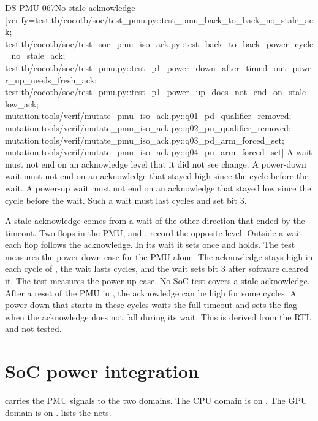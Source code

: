 \begin{requirement}{DS-PMU-067}{No stale acknowledge}
[verify={test:tb/cocotb/soc/test_pmu.py::test_pmu_back_to_back_no_stale_ack; test:tb/cocotb/soc/test_soc_pmu_iso_ack.py::test_back_to_back_power_cycle_no_stale_ack; test:tb/cocotb/soc/test_pmu.py::test_p1_power_down_after_timed_out_power_up_needs_fresh_ack; test:tb/cocotb/soc/test_pmu.py::test_p1_power_up_does_not_end_on_stale_low_ack; mutation:tools/verif/mutate_pmu_iso_ack.py::q01_pd_qualifier_removed; mutation:tools/verif/mutate_pmu_iso_ack.py::q02_pu_qualifier_removed; mutation:tools/verif/mutate_pmu_iso_ack.py::q03_pd_arm_forced_set; mutation:tools/verif/mutate_pmu_iso_ack.py::q04_pu_arm_forced_set}]
A wait must not end on an acknowledge level that it did not see change. A power-down wait must not end on an acknowledge that stayed high since the cycle before the wait. A power-up wait must not end on an acknowledge that stayed low since the cycle before the wait. Such a wait must last  cycles and set  bit 3.
\end{requirement}
\begin{information}
A stale acknowledge comes from a wait of the other direction that ended by the timeout. Two flops in the PMU,  and , record the opposite level. Outside a wait each flop follows the acknowledge. In its wait it sets once and holds. The test  measures the power-down case for the PMU alone. The acknowledge stays high in each cycle of , the wait lasts  cycles, and the wait sets  bit 3 after software cleared it. The test  measures the power-up case. No SoC test covers a stale acknowledge. After a reset of the PMU in , the acknowledge can be high for some cycles. A power-down that starts in these cycles waits the full timeout and sets the flag when the acknowledge does not fall during its wait. This is derived from the RTL and not tested.
\end{information}

\section{SoC power integration}\label{ds:ch:mod-power-management:soc}
 carries the PMU signals to the two domains. The CPU domain is on . The GPU domain is on .  lists the nets.

